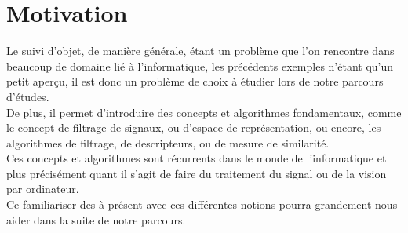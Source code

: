 \section{Motivation}
Le suivi d'objet, de manière générale, étant un problème que l'on rencontre dans beaucoup de domaine lié à l'informatique, les précédents exemples n'étant qu'un petit aperçu, il est donc un problème de choix à étudier lors de notre parcours d'études.\\
De plus, il permet d'introduire des concepts et algorithmes fondamentaux, comme le concept de filtrage de signaux, ou d'espace de représentation, ou encore, les algorithmes de filtrage, de descripteurs, ou de mesure de similarité.\\
Ces concepts et algorithmes sont récurrents dans le monde de l'informatique et plus précisément quant il s'agit de faire du traitement du signal ou de la vision par ordinateur.\\
Ce familiariser des à présent avec ces différentes notions pourra grandement nous aider dans la suite de notre parcours.\\





